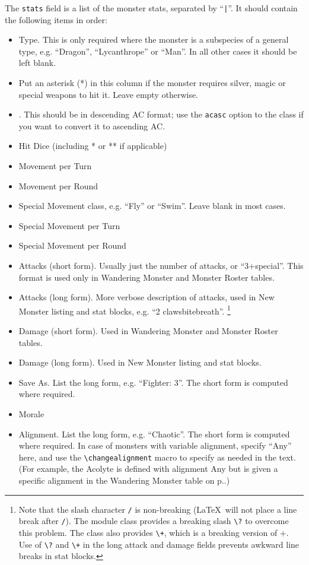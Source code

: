 \documentclass[a4paper,serif]{module}
\begin{document}
\noindent The \verb|stats| field is a list of the monster stats, separated by ``\verb:|:''. It should contain the following items in order:
\renewcommand{\labelitemi}{$\bullet$}
\begin{itemize}\setlength{\itemsep}{0pt}
\item Type. This is only required where the monster is a subspecies of a general type, e.g. ``Dragon'', ``Lycanthrope'' or ``Man''. In all other cases
it should be left blank.
\item Put an asterisk (*) in this column if the monster requires silver, magic or special weapons to hit it. Leave empty otherwise.
\item \ArmourClass. This should be in descending AC format; use the \verb|acasc| option to the class if you want to convert it to ascending AC.
\item Hit Dice (including * or ** if applicable)
\item Movement per Turn
\item Movement per Round
\item Special Movement class, e.g. ``Fly'' or ``Swim''. Leave blank in most cases.
\item Special Movement per Turn
\item Special Movement per Round
\item Attacks (short form). Usually just the number of attacks, or ``3+special''. This format is used only in Wandering Monster and Monster Roster tables.
\item Attacks (long form). More verbose description of attacks, used in New Monster listing and stat blocks, e.g. ``2 claws\?bite\+breath''.
\footnote{Note that the slash character \texttt{/} is non-breaking (\LaTeX~will not place a line break after \texttt{/}). The module class provides a breaking
slash \texttt{\textbackslash ?} to overcome this problem. The class also provides \texttt{\textbackslash +}, which is a breaking version of +. Use of
\texttt{\textbackslash ?} and \texttt{\textbackslash +} in the long attack and damage fields prevents awkward line breaks in stat blocks.}
\item Damage (short form). Used in Wandering Monster and Monster Roster tables.
\item Damage (long form). Used in New Monster listing and stat blocks.
\item Save As. List the long form, e.g. ``Fighter: 3''. The short form is computed where required.
\item Morale
\item Alignment. List the long form, e.g. ``Chaotic''. The short form is computed where required. In case of monsters with variable alignment, specify ``Any''
here, and use the \verb|\changealignment| macro to specify as needed in the text. (For example, the Acolyte is defined with alignment Any but is given a specific
alignment in the Wandering Monster table on p.\pageref{wanderingmonsters}.)


\end{itemize}
\end{document}
